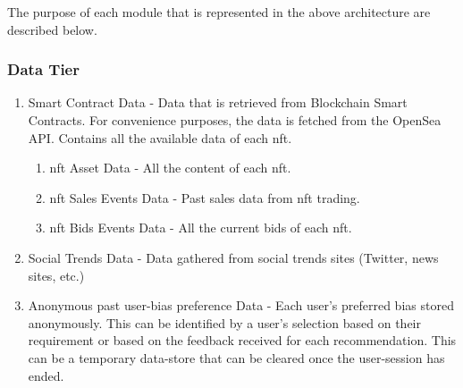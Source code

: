 \noindent The purpose of each module that is represented in the above architecture are described below.

\subsubsection{Data Tier}
\begin{enumerate}
    \item Smart Contract Data - Data that is retrieved from Blockchain Smart Contracts. For convenience purposes, the data is fetched from the OpenSea API. Contains all the available data of each \gls{nft}.
    \begin{enumerate}
        \item \gls{nft} Asset Data - All the content of each \gls{nft}.
        \item \gls{nft} Sales Events Data - Past sales data from \gls{nft} trading.
        \item \gls{nft} Bids Events Data - All the current bids of each \gls{nft}.  %
    \end{enumerate}
    \item Social Trends Data - Data gathered from social trends sites (Twitter, news sites, etc.)
    \item Anonymous past user-bias preference Data - Each user's preferred bias stored anonymously. This can be identified by a user's selection based on their requirement or based on the feedback received for each recommendation. This can be a temporary data-store that can be cleared once the user-session has ended.
\end{enumerate}

